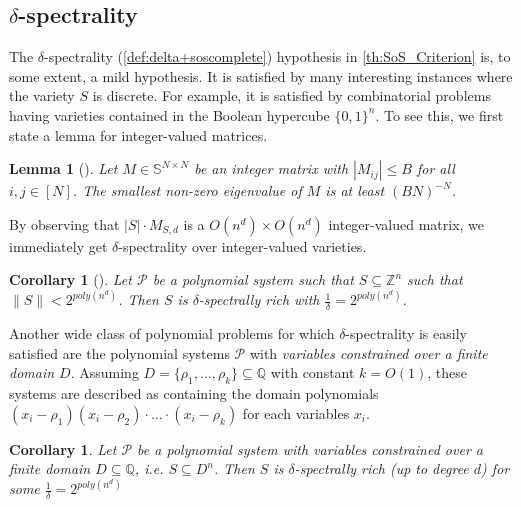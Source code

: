 \documentclass[11pt]{article}
\newtheorem{lemma}[theorem]{Lemma}
\newtheorem{corollary}[theorem]{Corollary}
\begin{document}
\subsection[Delta-spectrality]{$\delta$-spectrality}\label{sect:delta_spectrality}

The $\delta$-spectrality (\cref{def:delta+soscomplete}) hypothesis in \cref{th:SoS_Criterion} is, to some extent, a mild hypothesis. It is satisfied by many interesting instances where the variety $S$ is discrete. For example, it is satisfied by combinatorial problems having varieties contained in the Boolean hypercube $\{0,1\}^n$. To see this, we first state a lemma for integer-valued matrices.

\begin{lemma}[\cite{raghavendra_weitz2017}]\label{th:spectrality_integer_matrix}
    Let $M \in \mathbb{S}^{N \times N}$ be an integer matrix with $|M_{ij}| \leq B$ for all $i,j \in [N]$. The smallest non-zero eigenvalue of $M$ is at least $(BN)^{-N}$. 
\end{lemma}

By observing that $|S| \cdot M_{S,d}$ is a $O(n^d) \times O(n^d)$ integer-valued matrix, we immediately get $\delta$-spectrality over integer-valued varieties.

\begin{corollary}[\cite{raghavendra_weitz2017}]
    Let $\mathcal{P}$ be a polynomial system such that $S \subseteq \mathbb{Z}^n$ such that $\| S \| < 2^{poly(n^d)}$. Then $S$ is $\delta$-spectrally rich with $\frac{1}{\delta} = 2^{poly(n^d)}$.
\end{corollary}

Another wide class of polynomial problems for which $\delta$-spectrality is easily satisfied are the polynomial systems $\mathcal{P}$ with \textit{variables constrained over a finite domain $D$}. Assuming $D =\{\rho_1, \dots, \rho_k\} \subseteq \mathbb{Q}$ with constant $k=O(1)$, these systems are described as containing the domain polynomials $(x_i - \rho_1)(x_i - \rho_2) \cdot \dots \cdot (x_i - \rho_k)$ for each variables $x_i$.

\begin{corollary}\label{cor:rich-finite}
    Let $\mathcal{P}$ be a polynomial system with variables constrained over a finite domain $D \subseteq \mathbb{Q}$, i.e. $S \subseteq D^n$. Then $S$ is $\delta$-spectrally rich (up to degree $d$) for some $\frac{1}{\delta} = 2^{poly(n^d)}$ 
\end{corollary}
\end{document}
